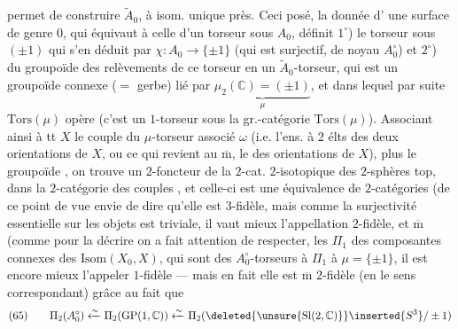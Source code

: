 permet de construire $\widetilde A_0$, à isom.
unique près. Ceci posé, la donnée d'
une surface  de genre $0$, qui équivaut
à celle d'un torseur \unsure{$[\mathrm{Isom}(\mathbb P^1_{\mathbb C},X))$|$(\mathrm{Isom}(\mathbb P^1_{\mathbb C},X))$}
sous $A_0$, définit $1^\circ$) le torseur sous
$(\pm1)$ qui s'en déduit par $\chi:A_0\longrightarrow\{\pm1\}$
(qui est surjectif, de noyau $A_0^\circ$) et \unsure{$\varphi$} $2^\circ$) du
groupoïde des relèvements de ce 
torseur en un $\widetilde A_0$-torseur, qui est
un groupoïde connexe ($=$ gerbe) lié par 
$\underbrace{\mu_2(\mathbb C)=(\pm1)}_{\mu}$,
et dans lequel par suite $\mathrm{Tors}(\mu)$  opère
(c'est un $1$-torseur sous la gr.-catégorie
$\mathrm{Tors}(\mu)$). Associant ainsi à tt $X$
le couple  du $\mu$-torseur associé $\omega$
(i.e. l'ens. à $2$ élts des deux orientations de
$X$, ou ce qui revient au $\overline{\mathrm m}$, le 
des orientations de $X$), plus le \inserted{$\mu$-}groupoïde
, on trouve un $2$-foncteur de la
$2$-cat. $2$-isotopique des $2$-sphères top,
dans la $2$-catégorie des couples ,
et celle-ci est une équivalence de
$2$-catégories (de ce point de vue 
envie de dire qu'elle est $3$-fidèle,
mais comme  la surjectivité essentielle
sur les objets est triviale, il vaut mieux
l'appellation $2$-fidèle, et $\overline{\mathrm m}$ (comme pour
la décrire on a fait attention de respecter,
les $\Pi_1$  des composantes connexes des 
$\mathrm{Isom}(X_0,X)$, qui sont des $A_0^\circ$-torseurs
 à $\Pi_1$  à $\mu=\{\pm1\}$, il est
encore mieux l'appeler $1$-fidèle ---
mais en fait elle est $\overline{\mathrm m}$ $2$-fidèle
(en le sens correspondant) grâce au
fait que
\[
(65)\qquad
\Pi_2(A_0^\circ)\xleftarrow{\sim}\Pi_2(\mathrm{GP}(1,\mathbb C))
\xleftarrow{\sim}\Pi_2(\deleted{\unsure{\mathrm{Sl}(2,\mathbb C)}}\inserted{S^3}/\pm1)
\]

